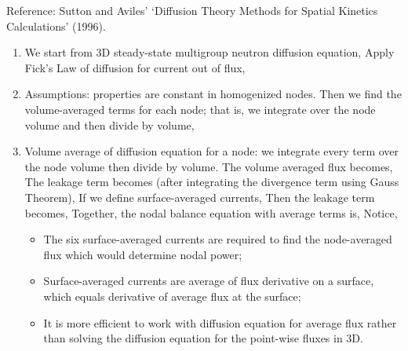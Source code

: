 \documentclass{school-22.211-notes}
\begin{document}
\clearpage
{}
Reference: Sutton and Aviles' `Diffusion Theory Methods for Spatial Kinetics Calculations' (1996). 
\begin{enumerate}
\item We start from 3D steady-state multigroup neutron diffusion equation, 
  Apply Fick's Law of diffusion for current out of flux, 

\item Assumptions: properties are constant in homogenized nodes. Then we find the volume-averaged terms for each node; that is, we integrate over the node volume and then divide by volume,

\item Volume average of diffusion equation for a node: we integrate every term over the node volume then divide by volume. The volume averaged flux becomes, 
  The leakage term becomes (after integrating the divergence term using Gauss Theorem), 
  If we define surface-averaged currents, 
  Then the leakage term becomes, 
  Together, the nodal balance equation with average terms is, 
  Notice, 
  \begin{itemize}
    \item The six surface-averaged currents are required to find the node-averaged flux which would determine nodal power;
    \item Surface-averaged currents are average of flux derivative on a surface, which equals derivative of average flux at the surface; 
    \item It is more efficient to work with diffusion equation for average flux rather than solving the diffusion equation for the point-wise fluxes in 3D. 
  \end{itemize}


\end{enumerate}
\end{document}
